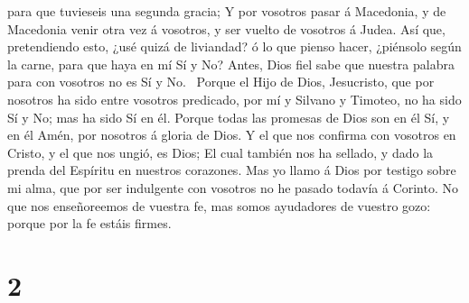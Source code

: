 para que tuvieseis una segunda gracia;  Y por vosotros
pasar á Macedonia, y de Macedonia venir otra vez á vosotros, y ser
vuelto de vosotros á Judea.  Así que, pretendiendo esto,
¿usé quizá de liviandad? ó lo que pienso hacer, ¿piénsolo según la
carne, para que haya en mí Sí y No?  Antes, Dios fiel
sabe que nuestra palabra para con vosotros no es Sí y
No.~ Porque el Hijo de Dios, Jesucristo, que por nosotros
ha sido entre vosotros predicado, por mí y Silvano y Timoteo, no ha sido
Sí y No; mas ha sido Sí en él.  Porque todas las promesas
de Dios son en él Sí, y en él Amén, por nosotros á gloria de Dios.
 Y el que nos confirma con vosotros en Cristo, y el que
nos ungió, es Dios;  El cual también nos ha sellado, y
dado la prenda del Espíritu en nuestros corazones.  Mas
yo llamo á Dios por testigo sobre mi alma, que por ser indulgente con
vosotros no he pasado todavía á Corinto.  No que nos
enseñoreemos de vuestra fe, mas somos ayudadores de vuestro gozo: porque
por la fe estáis firmes.

\hypertarget{section-1}{%
\section{2}\label{section-1}}

